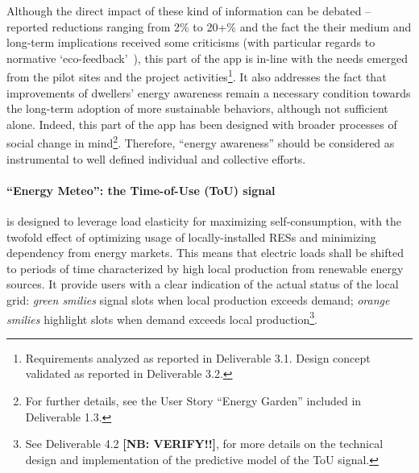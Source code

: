 Although the direct impact of these kind of information can be debated -- reported reductions ranging from 2\% to 20+\% \citep{eea_report} and the fact the their medium and
long-term implications received some criticisms (with particular regards to normative `eco-feedback'~\citep{Strengers2012,Cakici2014}), this part of the app is in-line with the needs emerged from
the pilot sites and the project activities\footnote{Requirements analyzed as reported in Deliverable 3.1. Design concept validated as reported in Deliverable 3.2.}.
It also addresses the fact that improvements of dwellers' energy awareness remain a necessary condition towards the long-term adoption of more sustainable behaviors,
although not sufficient alone. Indeed, this part of the app has been designed with broader processes of social change
in mind\footnote{For further details, see the User Story ``Energy Garden'' included in Deliverable 1.3.}. Therefore, ``energy awareness'' should be considered as instrumental to
well defined individual and collective efforts. 



\paragraph{``Energy Meteo'': the Time-of-Use (ToU) signal} is designed to leverage load elasticity for maximizing self-consumption, with the twofold effect of optimizing usage of locally-installed RESs and minimizing dependency from energy markets. This means that electric loads shall be shifted to periods of time characterized by high local production from renewable energy sources.
It provide users with a clear indication of the actual status of the local grid: \textit{green smilies} signal slots when local production exceeds demand; \textit{orange smilies} highlight slots
when demand exceeds local production\footnote{See Deliverable 4.2 \textbf{[NB: VERIFY!!]}, for more details on the technical design and implementation of the predictive model of the ToU signal.}.

